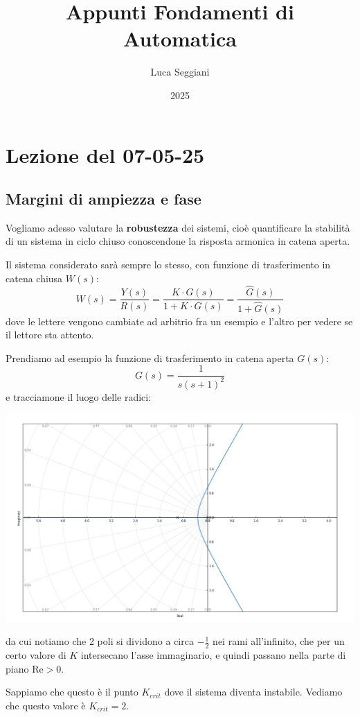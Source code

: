 \documentclass[a4paper,11pt]{article}
\title{Appunti Fondamenti di Automatica}
\author{Luca Seggiani}
\date{2025}
\begin{document}
\section{Lezione del 07-05-25}

\thispagestyle{empty}
\pagestyle{fancy}

\subsection{Margini di ampiezza e fase}
Vogliamo adesso valutare la \textbf{robustezza} dei sistemi, cioè quantificare la stabilità di un sistema in ciclo chiuso conoscendone la risposta armonica in catena aperta.

Il sistema considerato sarà sempre lo stesso, con funzione di trasferimento in catena chiusa $W(s)$:
$$
W(s) = \frac{Y(s)}{R(s)} = \frac{K \cdot G(s)}{1 + K \cdot G(s)} = \frac{\hat{G}(s)}{1 + \hat{G}(s)}
$$
dove le lettere vengono cambiate ad arbitrio fra un esempio e l'altro per vedere se il lettore sta attento.

Prendiamo ad esempio la funzione di trasferimento in catena aperta $G(s)$:
$$
G(s) = \frac{1}{s (s + 1)^2}
$$
e tracciamone il luogo delle radici:
\begin{center}
	\includegraphics[scale=0.4]{../figures/rlocus_margin.png}
\end{center}
da cui notiamo che 2 poli si dividono a circa $-\frac{1}{2}$ nei rami all'infinito, che per un certo valore di $K$ intersecano l'asse immaginario, e quindi passano nella parte di piano $\mathrm{Re} > 0$. 

Sappiamo che questo è il punto $K_{crit}$ dove il sistema diventa instabile.
Vediamo che questo valore è $K_{crit} = 2$.
\end{document}
